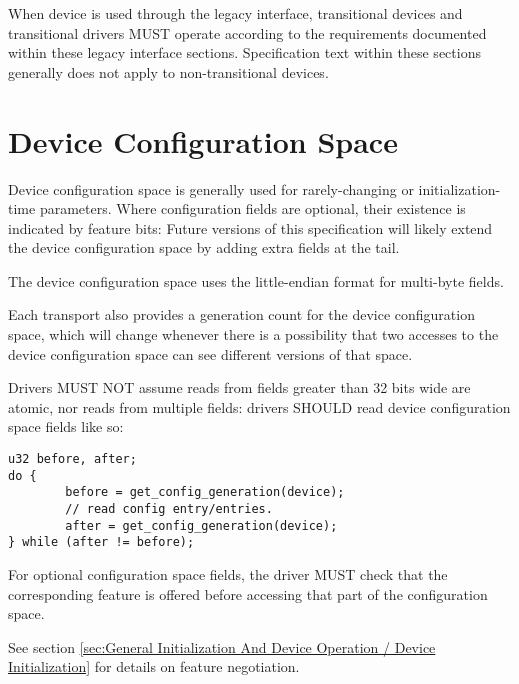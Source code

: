 When device is used through the legacy interface, transitional
devices and transitional drivers MUST operate according to the
requirements documented within these legacy interface sections.
Specification text within these sections generally does not apply
to non-transitional devices.

\section{Device Configuration Space}\label{sec:Basic Facilities of a Virtio Device / Device Configuration Space}

Device configuration space is generally used for rarely-changing or
initialization-time parameters.  Where configuration fields are
optional, their existence is indicated by feature bits: Future
versions of this specification will likely extend the device
configuration space by adding extra fields at the tail.

\begin{note}
The device configuration space uses the little-endian format
for multi-byte fields.
\end{note}

Each transport also provides a generation count for the device configuration
space, which will change whenever there is a possibility that two
accesses to the device configuration space can see different versions of that
space.

Drivers MUST NOT assume reads from
fields greater than 32 bits wide are atomic, nor reads from
multiple fields: drivers SHOULD read device configuration space fields like so:

\begin{lstlisting}
u32 before, after;
do {
        before = get_config_generation(device);
        // read config entry/entries.
        after = get_config_generation(device);
} while (after != before);
\end{lstlisting}

For optional configuration space fields, the driver MUST check that the
corresponding feature is offered before accessing that part of the configuration
space.
\begin{note}
See section \ref{sec:General Initialization And Device Operation / Device Initialization} for details on feature negotiation.
\end{note}

